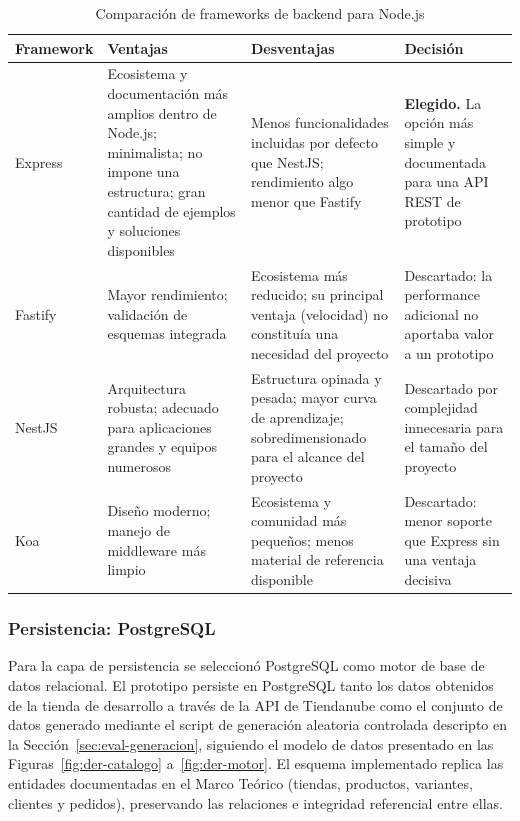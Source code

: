 \begin{table}[h]
\centering
\caption{Comparación de frameworks de backend para Node.js}
\label{tab:comparativo_backend}
\renewcommand{\arraystretch}{1.3}
\begin{tabular}{|m{2.3cm}|m{4.4cm}|m{4.4cm}|m{3.4cm}|}
\hline
\textbf{Framework} & \textbf{Ventajas} & \textbf{Desventajas} & \textbf{Decisión} \\
\hline
Express & Ecosistema y documentación más amplios dentro de Node.js; minimalista; no impone una estructura; gran cantidad de ejemplos y soluciones disponibles & Menos funcionalidades incluidas por defecto que NestJS; rendimiento algo menor que Fastify & \textbf{Elegido.} La opción más simple y documentada para una API REST de prototipo \\
\hline
Fastify & Mayor rendimiento; validación de esquemas integrada & Ecosistema más reducido; su principal ventaja (velocidad) no constituía una necesidad del proyecto & Descartado: la performance adicional no aportaba valor a un prototipo \\
\hline
NestJS & Arquitectura robusta; adecuado para aplicaciones grandes y equipos numerosos & Estructura opinada y pesada; mayor curva de aprendizaje; sobredimensionado para el alcance del proyecto & Descartado por complejidad innecesaria para el tamaño del proyecto \\
\hline
Koa & Diseño moderno; manejo de middleware más limpio & Ecosistema y comunidad más pequeños; menos material de referencia disponible & Descartado: menor soporte que Express sin una ventaja decisiva \\
\hline
\end{tabular}
\end{table}

\subsubsection{Persistencia: PostgreSQL}
\label{sec:persistencia}

Para la capa de persistencia se seleccionó PostgreSQL como motor de base de datos relacional. El prototipo persiste en PostgreSQL tanto los datos obtenidos de la tienda de desarrollo a través de la API de Tiendanube como el conjunto de datos generado mediante el script de generación aleatoria controlada descripto en la Sección~\ref{sec:eval-generacion}, siguiendo el modelo de datos presentado en las Figuras~\ref{fig:der-catalogo} a~\ref{fig:der-motor}. El esquema implementado replica las entidades documentadas en el Marco Teórico (tiendas, productos, variantes, clientes y pedidos), preservando las relaciones e integridad referencial entre ellas.

